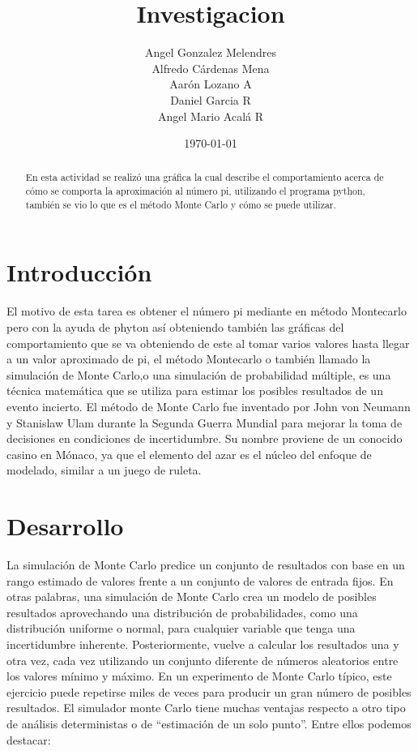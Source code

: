 \documentclass{article}
\author{Angel Gonzalez Melendres \\Alfredo Cárdenas Mena\\Aarón Lozano A\\Daniel Garcia R\\Angel Mario Acalá R} %
\title{Investigacion } %
\date{\today}
\begin{document}

\maketitle %

\begin{abstract} %
En esta actividad se realizó una gráfica la cual describe el comportamiento acerca de cómo se comporta la aproximación al número pi, utilizando el programa python, también se vio lo que es el método Monte Carlo y cómo se puede utilizar.
\end{abstract}

\section{Introducci\'{o}n}\label{intro} %
El motivo de esta tarea es obtener el número pi mediante en método Montecarlo pero con la ayuda de phyton así obteniendo también las gráficas del comportamiento que se va obteniendo de este al tomar varios valores hasta llegar a un valor aproximado de pi, el método Montecarlo o también llamado la simulación de Monte Carlo,o una simulación de probabilidad múltiple, es una técnica matemática que se utiliza para estimar los posibles resultados de un evento incierto. El método de Monte Carlo fue inventado por John von Neumann y Stanislaw Ulam durante la Segunda Guerra Mundial para mejorar la toma de decisiones en condiciones de incertidumbre. Su nombre proviene de un conocido casino en Mónaco, ya que el elemento del azar es el núcleo del enfoque de modelado, similar a un juego de ruleta.


\section{Desarrollo}

La simulación de Monte Carlo predice un conjunto de resultados con base en un rango estimado de valores frente a un conjunto de valores de entrada fijos. En otras palabras, una simulación de Monte Carlo crea un modelo de posibles resultados aprovechando una distribución de probabilidades, como una distribución uniforme o normal, para cualquier variable que tenga una incertidumbre inherente. Posteriormente, vuelve a calcular los resultados una y otra vez, cada vez utilizando un conjunto diferente de números aleatorios entre los valores mínimo y máximo. En un experimento de Monte Carlo típico, este ejercicio puede repetirse miles de veces para producir un gran número de posibles resultados.
El simulador monte Carlo tiene muchas ventajas respecto a otro tipo de análisis deterministas o de “estimación de un solo punto”. Entre ellos podemos destacar:
\end{document}
